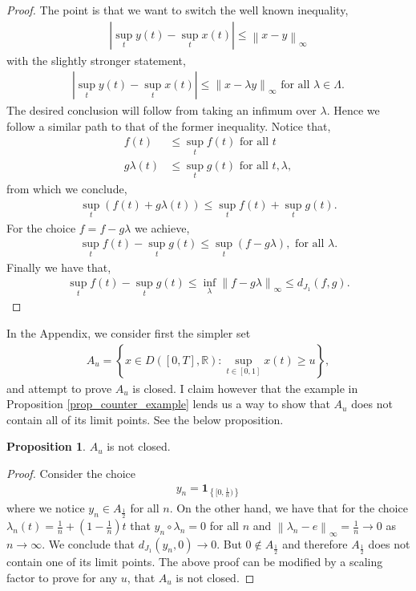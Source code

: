 \documentclass[12pt]{article}
\newcommand{\R}{\mathbb{R}}
\newcommand\norm[1]{\left\lVert#1\right\rVert}
\theoremstyle{definition}
\theoremstyle{definition}
\newtheorem{proposition}{Proposition}
\theoremstyle{definition}
\begin{document}
\begin{proof} The point is that we want to switch the well known inequality,
\begin{align*}
|\sup_t y(t)-\sup_t x(t)|\leq \norm{x-y}_{\infty}
\end{align*}
with the slightly stronger statement,
\begin{align*}
|\sup_t y(t)-\sup_t x(t)|\leq \norm{x-\lambda y}_{\infty} \text{ for all $\lambda\in \Lambda$}.
\end{align*}
The desired conclusion will follow from taking an infimum over $\lambda$. Hence we follow a similar path to that of the former inequality. Notice that,
\begin{align*}
f(t)&\leq \sup_t f(t) \text{ for all $t$}\\
g\lambda(t)&\leq \sup_t g(t) \text{ for all $t,\lambda$},
\end{align*}
from which we conclude,
\begin{align*}
\sup_t\left(f(t)+g\lambda(t)\right)\leq \sup_t f(t)+\sup_t g(t).
\end{align*}
For the choice $f=f-g\lambda$ we achieve,
\begin{align*}
\sup_t f(t)-\sup_t g(t)\leq \sup_t (f-g\lambda), \text{ for all $\lambda$}.
\end{align*}
Finally we have that,
\begin{align*}
\sup_t f(t)-\sup_t g(t)\leq \inf_{\lambda}\norm{f-g\lambda}_{\infty}\leq d_{J_1}(f,g).
\end{align*}


\end{proof}
In the Appendix, we consider first the simpler set 
\begin{align*}
A_u = \left\{x\in D\left([0,T],\R\right): \sup_{t\in[0,1]} x(t)\geq u\right\},
\end{align*}
and attempt to prove $A_u$ is closed. I claim however that the example in Proposition \ref{prop_counter_example} lends us a way to show that $A_u$ does not contain all of its limit points. See the below proposition.
\begin{proposition} $A_u$ is not closed.
\end{proposition}
\begin{proof} Consider the choice
\begin{align*}
y_n = \bm{1}_{\left\{[0,\frac{1}{n})\right\}}
\end{align*}
where we notice $y_n\in A_{\frac{1}{2}}$ for all $n$. On the other hand, we have that for the choice $\lambda_n(t) = \frac{1}{n}+(1-\frac{1}{n})t$ that $y_n\circ \lambda_n=0$ for all $n$ and $\norm{\lambda_n-e}_{\infty}=\frac{1}{n}\rightarrow 0 $ as $n\rightarrow \infty$. We conclude that $d_{J_1}(y_n,0)\rightarrow 0$. But $0\not\in A_{\frac{1}{2}}$ and therefore $A_\frac{1}{2}$ does not contain one of its limit points. The above proof can be modified by a scaling factor to prove for any $u$, that $A_u$ is not closed.
\end{proof}
\end{document}
